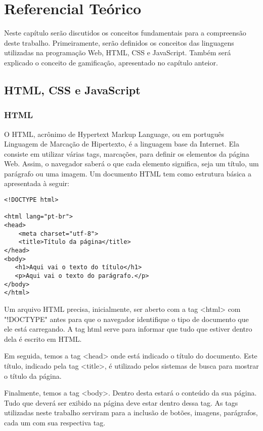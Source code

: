 \chapter[Referencial Teórico]{Referencial Teórico}
\label{cap:referencial}

Neste capítulo serão discutidos os conceitos fundamentais para a compreensão deste trabalho. Primeiramente, serão definidos os conceitos das linguagens utilizadas na programação Web, HTML, CSS e JavaScript. Também será explicado o conceito de gamificação, apresentado no capítulo anteior.

\section{HTML, CSS e JavaScript}
\subsection{HTML}
O HTML, acrônimo de Hypertext Markup Language, ou em português Linguagem de Marcação de Hipertexto, é a linguagem base da Internet. Ela consiste em utilizar várias tags, marcações, para definir os elementos da página Web. Assim, o navegador saberá o que cada elemento significa, seja um título, um parágrafo ou uma imagem. \cite{html} Um documento HTML tem como estrutura básica a apresentada à seguir:

\begin{verbatim}
<!DOCTYPE html>

<html lang="pt-br">
<head>
    <meta charset="utf-8">
    <title>Título da página</title>
</head>
<body>
   <h1>Aqui vai o texto do título</h1>
   <p>Aqui vai o texto do parágrafo.</p>
</body>
</html>
\end{verbatim}

Um arquivo HTML precisa, inicialmente, ser aberto com a tag <html> com "!DOCTYPE" antes para que o navegador identifique o tipo de documento que ele está carregando. A tag html serve para informar que tudo que estiver dentro dela é escrito em HTML.

Em seguida, temos a tag <head> onde está indicado o título do documento. Este título, indicado pela tag <title>, é utilizado pelos sistemas de busca para mostrar o título da página.

Finalmente, temos a tag <body>. Dentro desta estará o conteúdo da sua página. Tudo que deverá ser exibido na página deve estar dentro dessa tag. As tags utilizadas neste trabalho serviram para a inclusão de botões, imagens, parágrafos, cada um com sua respectiva tag. 


